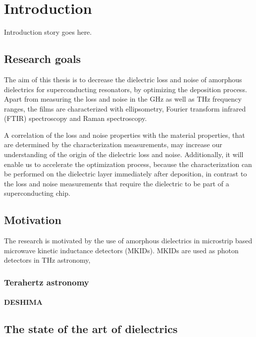 %
\chapter{Introduction}
\label{sec:intro}


Introduction story goes here.

\section{Research goals}
The aim of this thesis is to decrease the dielectric loss and noise of amorphous dielectrics for superconducting resonators, by optimizing the deposition process. Apart from measuring the loss and noise in the GHz as well as THz frequency ranges, the films are characterized with ellipsometry, Fourier transform infrared (FTIR) spectroscopy and Raman spectroscopy. 

A correlation of the loss and noise properties with the material properties, that are determined by the characterization measurements, may increase our understanding of the origin of the dielectric loss and noise. Additionally, it will enable us to accelerate the optimization process, because the characterization can be performed on the dielectric layer immediately after deposition, in contrast to the loss and noise measurements that require the dielectric to be part of a superconducting chip.
 
\section{Motivation}
The research is motivated by the use of amorphous dielectrics in microstrip based microwave kinetic inductance detectors (MKIDs). MKIDs are used as photon detectors in THz astronomy, 

\subsection{Terahertz astronomy}
\subsubsection{DESHIMA}
\label{sec:intro:results}

\Blindtext[1][2]

\section{The state of the art of dielectrics}
